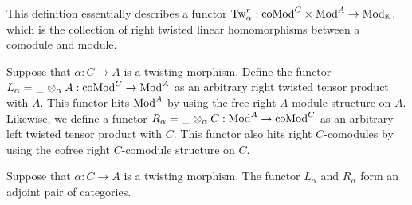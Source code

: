 \documentclass[../thesis.tex]{subfiles}
\begin{document}
            This definition essentially describes a functor $\tt{Tw}_\alpha^r: \tt{coMod}^C \times \tt{Mod}^A \rightarrow \tt{Mod}_\mathbb{K}$, which is the collection of right twisted linear homomorphisms between a comodule and module.

            Suppose that $\alpha: C \rightarrow A$ is a twisting morphism. Define the functor $L_\alpha = \argument \otimes_\alpha A: \tt{coMod}^C \rightarrow \tt{Mod}^A$ as an arbitrary right twisted tensor product with $A$. This functor hits $\tt{Mod}^A$ by using the free right $A$-module structure on $A$. Likewise, we define a functor $R_\alpha = \argument \otimes_\alpha C: \tt{Mod}^A \rightarrow \tt{coMod}^C$ as an arbitrary left twisted tensor product with $C$. This functor also hits right $C$-comodules by using the cofree right $C$-comodule structure on $C$.

            \begin{proposition}\label{prop: L-R-adj}
                Suppose that $\alpha: C \rightarrow A$ is a twisting morphism. The functor $L_\alpha$ and $R_\alpha$ form an adjoint pair of categories.
                \begin{center}
                \end{center}
            \end{proposition}
\end{document}
